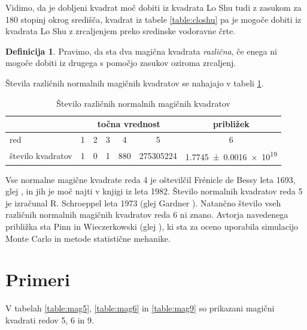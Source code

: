 \documentclass[a4paper,12pt]{article}
\newcommand{\pojem}[1]{\emph{\color{purple}#1}}
\theoremstyle{definition}
\newtheorem{definicija}{Definicija}
\theoremstyle{plain}
\begin{document}
Vidimo, da je dobljeni kvadrat moč dobiti iz kvadrata Lo Shu tudi z zasukom za
180 stopinj okrog središča, kvadrat iz tabele \ref{table:closhu} pa je mogoče dobiti
iz kvadrata Lo Shu z zrcaljenjem preko sredinske vodoravne črte.

\begin{definicija}
   Pravimo, da sta dva magična kvadrata \pojem{različna}, če enega ni mogoče dobiti
   iz drugega s pomočjo zasukov oziroma zrcaljenj.
\end{definicija}

Števila različnih normalnih magičnih kvadratov se nahajajo v tabeli \ref{table:stevila}.

\begin{table}[!ht]
   \centering
   \caption{Število različnih normalnih magičnih kvadratov}
   \label{table:stevila}
   \begin{tabular}{lcccccc}\toprule
      & \multicolumn{5}{c}{točna vrednost} & približek \\
      \midrule
      red & 1 & 2 & 3 & 4 & 5 & 6 \\
      število kvadratov & 1 & 0 & 1 & 880 & \num{275305224} & \num[separate-uncertainty]{1.7745 \pm 0.0016 e19} \\
      \bottomrule
   \end{tabular}
\end{table}

Vse normalne magične kvadrate reda 4 je oštevilčil Frénicle de Bessy
leta 1693, glej \cite{bessy}, in jih je moč najti v knjigi \cite{berlekamp}
iz leta 1982. Število normalnih kvadratov reda 5 je izračunal
R. Schroeppel leta 1973 (glej Gardner \cite{gardner}).
Natančno število vseh različnih normalnih magičnih kvadratov reda 6 ni znano.
Avtorja navedenega približka sta Pinn in Wieczerkowski (glej \cite{pinn}), ki
sta za oceno uporabila simulacijo Monte Carlo in metode statistične mehanike.


\section{Primeri}

V tabelah \ref{table:mag5}, \ref{table:mag6} in \ref{table:mag9} so prikazani
magični kvadrati redov 5, 6 in 9.

\end{document}
